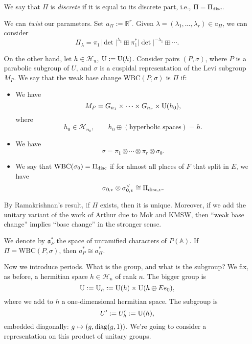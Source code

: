 \documentclass[reqno]{amsart} 
\begin{document}
We say that $\Pi$ is \emph{discrete} if it is equal to its discrete part, i.e., $\Pi = \Pi_{\operatorname{disc}}$.

We can \emph{twist} our parameters.  Set $a_\Pi := \mathbb{R}^{r}$.  Given $\lambda = (\lambda_1, \dotsc, \lambda_r ) \in a_{\Pi }$, we can consider
\begin{equation*}
\Pi_\lambda = \pi_1 \lvert \det  \rvert^{\lambda_1 } \boxplus \pi_1^\ast \lvert \det  \rvert^{- \lambda_1 } \boxplus \dotsb.
\end{equation*}

On the other hand, let $h \in \mathcal{H}_n$, $\operatorname{U} := \operatorname{U} (h)$. Consider pairs $(P, \sigma)$, where $P$ is a parabolic subgroup of $U$, and $\sigma$ is a cuspidal representation of the Levi subgroup $M_P $.  We say that the weak base change $\mathrm{WBC} (P, \sigma )$ is $\Pi$ if:
\begin{itemize}
\item We have
  \begin{equation*}
    M_P = G_{n_1 } \times \dotsb \times G_{n_r } \times \operatorname{U} (h_0),
  \end{equation*}
  where
  \begin{equation*}
    h_0 \in \mathcal{H}_{n_0 }, \qquad
    h_0 \oplus (\text{hyperbolic spaces}) = h.
  \end{equation*}
\item We have
  \begin{equation*}
    \sigma = \pi_1 \otimes \dotsb \otimes \pi_r \otimes \sigma_0.
  \end{equation*}
\item We say that $\mathrm{WBC} (\sigma_0) = \Pi_{\operatorname{disc}}$ if for almost all places of $F$ that split in $E$, we have
  \begin{equation*}
\sigma_{0, v} \otimes \sigma_{0, v}^\vee \cong \Pi_{\operatorname{disc}, v}.
\end{equation*}
\end{itemize}
\begin{remark}
  By Ramakrishnan's result, if $\Pi$ exists, then it is unique.  Moreover, if we add the unitary variant of the work of Arthur due to Mok and KMSW, then ``weak base change'' implies ``base change'' in the stronger sense.
\end{remark}
We denote by $\mathfrak{a}_P^\ast $ the space of unramified characters of $P (\mathbb{A})$.  If $\Pi = \mathrm{WBC} (P, \sigma)$, then $a_P^\ast \cong a_\Pi^\ast$.

Now we introduce periods.  What is the group, and what is the subgroup?  We fix, as before, a hermitian space $h \in \mathcal{H}_n$ of rank $n$.  The bigger group is
\begin{equation*}
\operatorname{U} := \operatorname{U}_h := \operatorname{U} (h) \times \operatorname{U} (h \oplus E e_0),
\end{equation*}
where we add to $h$ a one-dimensional hermitian space.  The subgroup is
\begin{equation*}
U' := U'_h := \operatorname{U}(h),
\end{equation*}
embedded diagonally: $g \mapsto (g, \operatorname{diag}(g,1))$.  We're going to consider a representation on this product of unitary groups.
\end{document}
